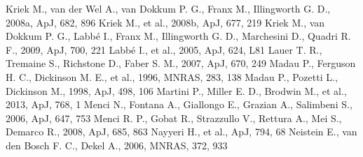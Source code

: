 \documentclass[useAMS,usenatbib]{mn2e}
\begin{document}
\begin{thebibliography}{}
 Kriek M., van der Wel A., van Dokkum P. G., Franx M., Illingworth G. D., 2008a, ApJ, 682, 896
 Kriek M., et al., 2008b, ApJ, 677, 219
 Kriek M., van Dokkum P. G., Labb\'e I., Franx M., Illingworth G. D., Marchesini D., Quadri R. F., 2009, ApJ, 700, 221
 Labb\'e I., et al., 2005, ApJ, 624, L81
 Lauer T. R., Tremaine S., Richstone D., Faber S. M., 2007, ApJ, 670, 249
 Madau P., Ferguson H. C., Dickinson M. E., et al., 1996, MNRAS, 283, 138 
 Madau P., Pozetti L., Dickinson M., 1998, ApJ, 498, 106
 Martini P., Miller E. D., Brodwin M., et al., 2013, ApJ, 768, 1
 Menci N., Fontana A., Giallongo E., Grazian A., Salimbeni S., 2006, ApJ, 647, 753
 Menci R. P., Gobat R., Strazzullo V., Rettura A., Mei S., Demarco R., 2008, ApJ, 685, 863
 Nayyeri H., et al., ApJ, 794, 68
 Neistein E., van den Bosch F. C., Dekel A., 2006, MNRAS, 372, 933

\end{thebibliography}
\end{document}

